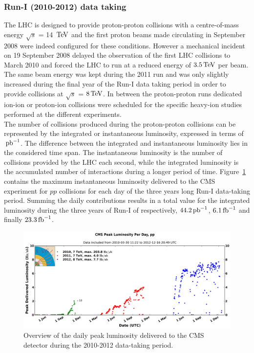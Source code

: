 \subsubsection{Run-I (2010-2012) data taking}

The LHC is  designed to provide proton-proton collisions with a centre-of-mass energy $\sqrt{s}$ = 14 $\, \mathrm{TeV}$ and the first proton beams made circulating in September 2008 were indeed configured for these conditions. However a mechanical incident on 19 September 2008 delayed the observation of the first LHC collisions to March 2010 and forced the LHC to run at a reduced energy of $3.5 \, \mathrm{TeV}$ per beam. The same beam energy was kept during the 2011 run and was only slightly increased during the final year of the Run-I data taking period in order to provide collisions at $\sqrt{s}$ = $8 \, \mathrm{TeV}$. In between the proton-proton runs dedicated ion-ion or proton-ion collisions were scheduled for the specific heavy-ion studies performed at the different experiments.
\\
The number of collisions produced during the proton-proton collisions can be represented by the integrated or instantaneous luminosity, expressed in terms of $\, \mathrm{pb}^{-1}$. The difference between the integrated and instantaneous luminosity lies in the considered time span. The instantaneous luminosity is the number of collisions provided by the LHC each second, while the integrated luminosity is the accumulated number of interactions during a longer period of time. Figure~\ref{fig::InstLumi} contains the maximum instantaneous luminosity delivered to the CMS experiment for $pp$ collisions for each day of the three years long Run-I data-taking period.
Summing the daily contributions results in a total value for the integrated luminosity during the three years of Run-I of respectively, $44.2 \, \mathrm{pb}^{-1}$, $6.1 \, \mathrm{fb}^{-1}$ and finally $23.3 \, \mathrm{fb}^{-1}$.
\begin{figure}[h!t]
 \centering
 \includegraphics[width = 0.95 \textwidth]{Chapters/Chapter2_CERN/Figures/InstanteneousLumi_FullRunI.png}
 \caption{Overview of the daily peak luminosity delivered to the CMS detector during the 2010-2012 data-taking period.} 
 \label{fig::InstLumi}
\end{figure}


